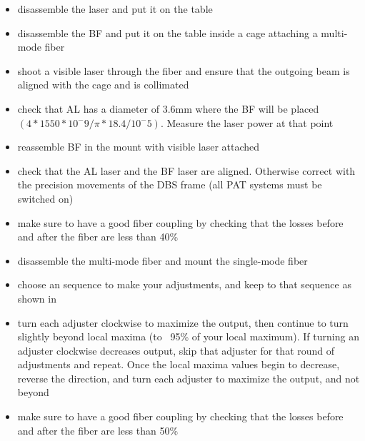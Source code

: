 \begin{itemize}
  \item disassemble the laser and put it on the table
  \item disassemble the BF and put it on the table inside a cage attaching a multi-mode fiber
  \item shoot a visible laser through the fiber and ensure that the outgoing beam is aligned with the cage and is collimated
  \item check that AL has a diameter of 3.6mm where the BF will be placed $(4 * 1550 * 10^-9 / \pi * 18.4 / 10^-5)$. Measure the laser power at that point
  \item reassemble BF in the mount with visible laser attached
  \item check that the AL laser and the BF laser are aligned. Otherwise correct with the precision movements of the DBS frame (all PAT systems must be switched on)
  \item make sure to have a good fiber coupling by checking that the losses before and after the fiber are less than 40\%
\end{itemize}

\begin{itemize}
  \item disassemble the multi-mode fiber and mount the single-mode fiber
  \item choose an sequence to make your adjustments, and keep to that sequence as shown in 
  \item turn each adjuster clockwise to maximize the output, then continue to turn slightly beyond local maxima (to ~95\% of your local maximum). If turning an adjuster clockwise decreases output, skip that adjuster for that round of adjustments and repeat. Once the local maxima values begin to decrease, reverse the direction, and turn each adjuster to maximize the output, and not beyond
  \item make sure to have a good fiber coupling by checking that the losses before and after the fiber are less than 50\%
\end{itemize}
